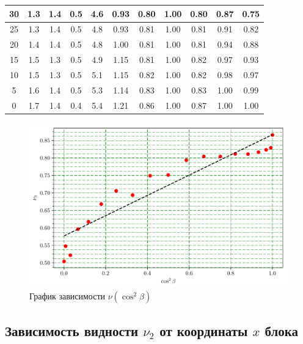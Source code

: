 \documentclass{letask}
\begin{document}
\begin{table}[H]
\begin{tabular}{|c|c|c|c|c|c|c|c|c|c|c|}
30      & 1.3   & 1.4   & 0.5   & 4.6   & 0.93     & 0.80  & 1.00    & 0.80    & 0.87         & 0.75           \\ \hline
25      & 1.3   & 1.4   & 0.5   & 4.8   & 0.93     & 0.81  & 1.00    & 0.81    & 0.91         & 0.82           \\ \hline
20      & 1.4   & 1.4   & 0.5   & 4.8   & 1.00     & 0.81  & 1.00    & 0.81    & 0.94         & 0.88           \\ \hline
15      & 1.5   & 1.3   & 0.5   & 4.9   & 1.15     & 0.81  & 1.00    & 0.82    & 0.97         & 0.93           \\ \hline
10      & 1.5   & 1.3   & 0.5   & 5.1   & 1.15     & 0.82  & 1.00    & 0.82    & 0.98         & 0.97           \\ \hline
5       & 1.6   & 1.4   & 0.5   & 5.3   & 1.14     & 0.83  & 1.00    & 0.83    & 1.00         & 0.99           \\ \hline
0       & 1.7   & 1.4   & 0.4   & 5.4   & 1.21     & 0.86  & 1.00    & 0.87    & 1.00         & 1.00           \\ \hline
\end{tabular}
\end{table}

\begin{figure}[H]
\centering
\includegraphics[width = 0.75 \lw]{graph}
\caption{График зависимости $ \nu({\cos}^2 \beta) $}
\end{figure}


\subsection*{Зависимость видности $\nu_2$ от координаты $x$ блока}
\end{document}
